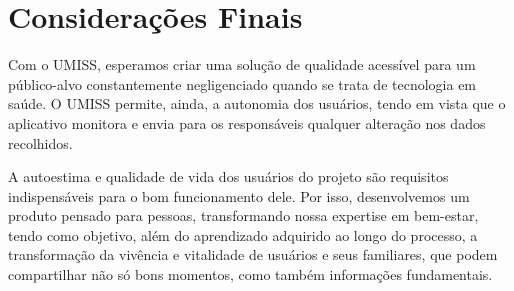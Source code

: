 \chapter{Considerações Finais}
\label{chapter:consideracoes}

Com o UMISS, esperamos criar uma solução de qualidade acessível para um público-alvo constantemente negligenciado quando se trata de tecnologia em saúde. O UMISS permite, ainda, a autonomia dos usuários, tendo em vista que o aplicativo monitora e envia para os responsáveis qualquer alteração nos dados recolhidos.

A autoestima e qualidade de vida dos usuários do projeto são requisitos indispensáveis para o bom funcionamento dele. Por isso, desenvolvemos um produto pensado para pessoas, transformando nossa expertise em bem-estar, tendo como objetivo, além do aprendizado adquirido ao longo do processo, a transformação da vivência e vitalidade de usuários e seus familiares, que podem compartilhar não só bons momentos, como também informações fundamentais.
